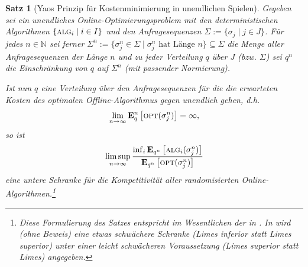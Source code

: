 \documentclass[a4paper,ngerman,12pt,bibtotoc]{scrartcl}
\theoremstyle{definition}
\theoremstyle{plain}
\newtheorem{satz}[defn]{Satz}
\theoremstyle{remark}
\newcommand{\NN}{\mathbb{N}}
\renewcommand{\_}{\mathpunct{.}\,}
\newcommand{\?}{\,{:}\,}
\newcommand{\Alg}{\ensuremath{\textsc{alg}}}
\newcommand{\Opt}{\ensuremath{\textsc{opt}}}
\newcommand{\EE}{\mathbf{E}}
\newcommand{\sjn}{\sigma_j^n}
\begin{document}
	\begin{satz}[Yaos Prinzip für Kostenminimierung in unendlichen Spielen]
		Gegeben sei ein unendliches Online-Optimierungsproblem mit den deterministischen Algorithmen $\{\Alg_i \mid i\in I\}$ und den Anfragesequenzen $\Sigma:= \{\sigma_j \mid j \in J\}$. Für jedes $n \in \NN$ sei ferner $\Sigma^n := \{\sjn\in\Sigma\mid\sjn \text{ hat Länge } n \} \subseteq \Sigma$ die Menge aller Anfragesequenzen der Länge $n$ und zu jeder Verteilung $q$ über $J$ (bzw. $\Sigma$) sei $q^n$ die Einschränkung von $q$ auf $\Sigma^n$ (mit passender Normierung).
		
		Ist nun $q$ eine Verteilung über den Anfragesequenzen für die die erwarteten Kosten des optimalen Offline-Algorithmus gegen unendlich gehen, d.h.
			\[\lim_{n \to \infty} \EE_{q}^n\left[\Opt(\sjn)\right] = \infty,\]
		so ist 
			\[\limsup_{n\to\infty} \frac{\inf_i\EE_{q^n}\left[\Alg_i(\sjn)\right]}{\EE_{q^n}\left[\Opt(\sjn)\right]}\]
		eine untere Schranke für die Kompetitivität aller randomisierten Online-Algorithmen.\footnote{Diese Formulierung des Satzes entspricht im Wesentlichen der in \cite{borodin}. In \cite{OCCA} wird (ohne Beweis) eine etwas schwächere Schranke (Limes inferior statt Limes superior) unter einer leicht schwächeren Voraussetzung (Limes superior statt Limes) angegeben.}
	\end{satz}	
	
\end{document}
